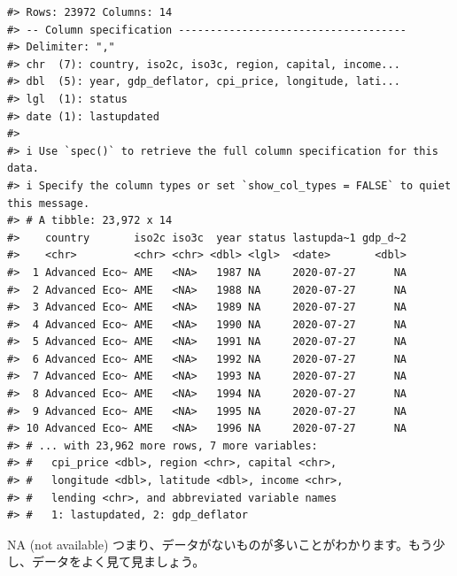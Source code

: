 \documentclass[
]{bxjsbook}
\theoremstyle{definition}
\theoremstyle{definition}
\theoremstyle{definition}
\theoremstyle{definition}
\theoremstyle{remark}
\begin{document}
\begin{verbatim}
#> Rows: 23972 Columns: 14
#> -- Column specification ------------------------------------
#> Delimiter: ","
#> chr  (7): country, iso2c, iso3c, region, capital, income...
#> dbl  (5): year, gdp_deflator, cpi_price, longitude, lati...
#> lgl  (1): status
#> date (1): lastupdated
#> 
#> i Use `spec()` to retrieve the full column specification for this data.
#> i Specify the column types or set `show_col_types = FALSE` to quiet this message.
#> # A tibble: 23,972 x 14
#>    country       iso2c iso3c  year status lastupda~1 gdp_d~2
#>    <chr>         <chr> <chr> <dbl> <lgl>  <date>       <dbl>
#>  1 Advanced Eco~ AME   <NA>   1987 NA     2020-07-27      NA
#>  2 Advanced Eco~ AME   <NA>   1988 NA     2020-07-27      NA
#>  3 Advanced Eco~ AME   <NA>   1989 NA     2020-07-27      NA
#>  4 Advanced Eco~ AME   <NA>   1990 NA     2020-07-27      NA
#>  5 Advanced Eco~ AME   <NA>   1991 NA     2020-07-27      NA
#>  6 Advanced Eco~ AME   <NA>   1992 NA     2020-07-27      NA
#>  7 Advanced Eco~ AME   <NA>   1993 NA     2020-07-27      NA
#>  8 Advanced Eco~ AME   <NA>   1994 NA     2020-07-27      NA
#>  9 Advanced Eco~ AME   <NA>   1995 NA     2020-07-27      NA
#> 10 Advanced Eco~ AME   <NA>   1996 NA     2020-07-27      NA
#> # ... with 23,962 more rows, 7 more variables:
#> #   cpi_price <dbl>, region <chr>, capital <chr>,
#> #   longitude <dbl>, latitude <dbl>, income <chr>,
#> #   lending <chr>, and abbreviated variable names
#> #   1: lastupdated, 2: gdp_deflator
\end{verbatim}

NA (not available) つまり、データがないものが多いことがわかります。もう少し、データをよく見て見ましょう。
\end{document}
